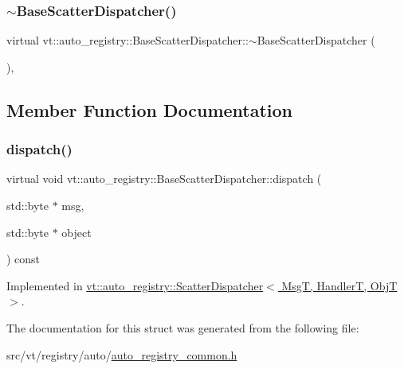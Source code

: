 \subsubsection{\texorpdfstring{$\sim$\+Base\+Scatter\+Dispatcher()}{~BaseScatterDispatcher()}}
{\footnotesize\ttfamily virtual vt\+::auto\+\_\+registry\+::\+Base\+Scatter\+Dispatcher\+::$\sim$\+Base\+Scatter\+Dispatcher (\begin{DoxyParamCaption}{ }\end{DoxyParamCaption})\hspace{0.3cm}{\ttfamily [virtual]}, {\ttfamily [default]}}



\subsection{Member Function Documentation}
\mbox{\label{structvt_1_1auto__registry_1_1_base_scatter_dispatcher_a73e838ab5c74e75c304dca8987d8971f}} 
\subsubsection{\texorpdfstring{dispatch()}{dispatch()}}
{\footnotesize\ttfamily virtual void vt\+::auto\+\_\+registry\+::\+Base\+Scatter\+Dispatcher\+::dispatch (\begin{DoxyParamCaption}\item[{std\+::byte $\ast$}]{msg,  }\item[{std\+::byte $\ast$}]{object }\end{DoxyParamCaption}) const\hspace{0.3cm}{\ttfamily [pure virtual]}}



Implemented in \hyperlink{structvt_1_1auto__registry_1_1_scatter_dispatcher_a1be99f3b95f4573106bd4bee68c8fd96}{vt\+::auto\+\_\+registry\+::\+Scatter\+Dispatcher$<$ Msg\+T, Handler\+T, Obj\+T $>$}.



The documentation for this struct was generated from the following file\+:\begin{DoxyCompactItemize}
\item 
src/vt/registry/auto/\hyperlink{auto__registry__common_8h}{auto\+\_\+registry\+\_\+common.\+h}\end{DoxyCompactItemize}
